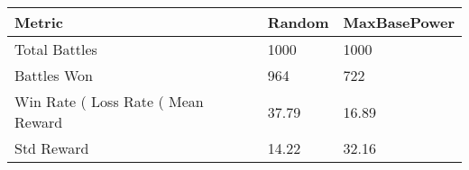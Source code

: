 \begin{tabular}{lll}
\toprule
Metric & Random & MaxBasePower \\
\midrule
Total Battles & 1000 & 1000 \\
Battles Won & 964 & 722 \\
Win Rate (%
Loss Rate (%
Mean Reward & 37.79 & 16.89 \\
Std Reward & 14.22 & 32.16 \\
\bottomrule
\end{tabular}
